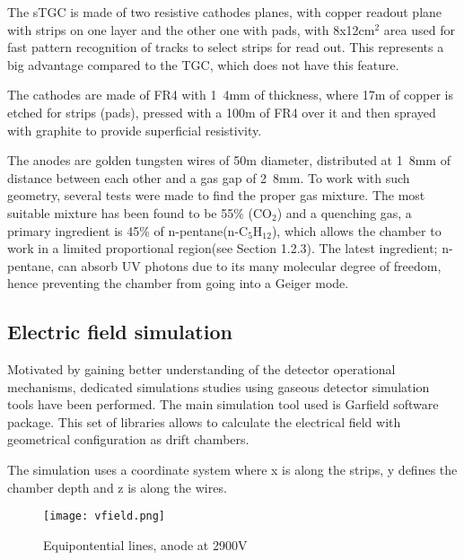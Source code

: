 The sTGC is made of two resistive cathodes planes, with copper readout plane with strips on one layer and the other one
with pads, with \unit{8x12}{cm$^2$} area used for fast pattern recognition of tracks to select strips for read out. This
represents a big
advantage compared to the TGC, which does not have this feature.\par

The cathodes are made of FR4 with \unit{1.4}{mm} of thickness, where \si{17}{\micro m} of copper is etched for strips
(pads), pressed with a \unit{100}{\micro m} of FR4 over it and then sprayed with graphite to provide superficial
resistivity.\par

The anodes are golden tungsten wires of \unit{50}{\micro m} diameter,
distributed at \unit{1.8}{mm} of distance between each other and a gas gap of \unit{2.8}{mm}. To work with such geometry, several
tests were made to find the proper gas
mixture\cite{gaschoice}. The most suitable mixture has been found to be 55\% (CO$_2$)
and a quenching gas, a primary ingredient is 45\% of n-pentane(n-C$_5$H$_{12}$), which allows the chamber to work in a limited
proportional region\cite{driftbook}(see Section 1.2.3). 
The latest ingredient; n-pentane, can absorb UV photons due to its many molecular degree of freedom,
hence preventing the chamber from going into a Geiger mode.\par 




\subsection{Electric field simulation}

Motivated by gaining better understanding of the detector operational mechanisms, dedicated simulations studies using
gaseous detector simulation tools have been performed. The main simulation tool used is Garfield
\cite{garfield2,garfield1} software package. This set of libraries allows to calculate the electrical field with
geometrical configuration as drift chambers.\par
The simulation uses a coordinate system where x is along the strips, y defines the chamber depth and z is along the
wires.\par

\begin{figure}[ht]
	\centering
	\texttt{[image: vfield.png]}
	\caption{Equipontential lines, anode at 2900V}\label{fig:vfield}
\end{figure}

